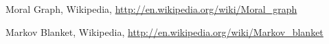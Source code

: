 Moral Graph, Wikipedia, 
\url{http://en.wikipedia.org/wiki/Moral_graph}

Markov Blanket, Wikipedia, 
\url{http://en.wikipedia.org/wiki/Markov_blanket}
